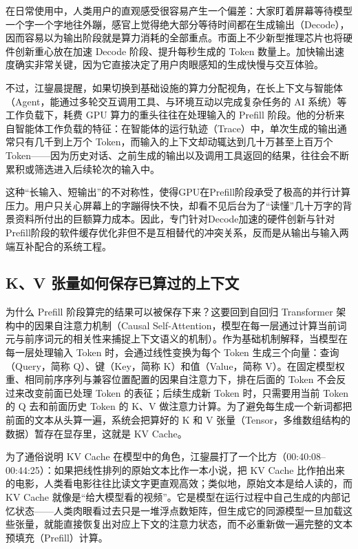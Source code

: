 \documentclass[UTF8,a4paper,11pt,fontset=fandol]{ctexart}
\begin{document}
在日常使用中，人类用户的直观感受很容易产生一个偏差：大家盯着屏幕等待模型一个字一个字地往外蹦，感官上觉得绝大部分等待时间都在生成输出（Decode），因而容易以为输出阶段就是算力消耗的全部重点。市面上不少新型推理芯片也将硬件创新重心放在加速 Decode 阶段、提升每秒生成的 Token 数量上。加快输出速度确实非常关键，因为它直接决定了用户肉眼感知的生成快慢与交互体验。

不过，江鋆晨提醒，如果切换到基础设施的算力分配视角，在长上下文与智能体（Agent，能通过多轮交互调用工具、与环境互动以完成复杂任务的 AI 系统）等工作负载下，耗费 GPU 算力的重头往往在处理输入的 Prefill 阶段。他的分析来自智能体工作负载的特征：在智能体的运行轨迹（Trace）中，单次生成的输出通常只有几千到上万个 Token，而输入的上下文却动辄达到几十万甚至上百万个 Token——因为历史对话、之前生成的输出以及调用工具返回的结果，往往会不断累积或筛选进入后续轮次的输入中。

这种“长输入、短输出”的不对称性，使得GPU在Prefill阶段承受了极高的并行计算压力。用户只关心屏幕上的字蹦得快不快，却看不见后台为了“读懂”几十万字的背景资料所付出的巨额算力成本。因此，专门针对Decode加速的硬件创新与针对Prefill阶段的软件缓存优化非但不是互相替代的冲突关系，反而是从输出与输入两端互补配合的系统工程。

\subsection{K、V 张量如何保存已算过的上下文}
为什么 Prefill 阶段算完的结果可以被保存下来？这要回到自回归 Transformer 架构中的因果自注意力机制（Causal Self-Attention，模型在每一层通过计算当前词元与前序词元的相关性来捕捉上下文语义的机制）。作为基础机制解释，当模型在每一层处理输入 Token 时，会通过线性变换为每个 Token 生成三个向量：查询（Query，简称 Q）、键（Key，简称 K）和值（Value，简称 V）。在固定模型权重、相同前序序列与兼容位置配置的因果自注意力下，排在后面的 Token 不会反过来改变前面已处理 Token 的表征；后续生成新 Token 时，只需要用当前 Token 的 Q 去和前面历史 Token 的 K、V 做注意力计算。为了避免每生成一个新词都把前面的文本从头算一遍，系统会把算好的 K 和 V 张量（Tensor，多维数组结构的数据）暂存在显存里，这就是 KV Cache。

为了通俗说明 KV Cache 在模型中的角色，江鋆晨打了一个比方（00:40:08–00:44:25）：如果把线性排列的原始文本比作一本小说，把 KV Cache 比作拍出来的电影，人类看电影往往比读文字更直观高效；类似地，原始文本是给人读的，而 KV Cache 就像是“给大模型看的视频”。它是模型在运行过程中自己生成的内部记忆状态——人类肉眼看过去只是一堆浮点数矩阵，但生成它的同源模型一旦加载这些张量，就能直接恢复出对应上下文的注意力状态，而不必重新做一遍完整的文本预填充（Prefill）计算。
\end{document}
